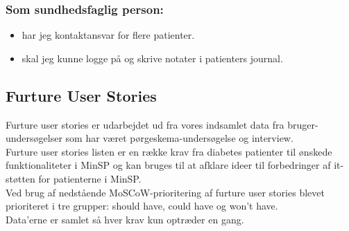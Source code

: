 \subsubsection*{Som sundhedsfaglig person:}
\begin{itemize}
\item har jeg kontaktansvar for flere patienter.
\item skal jeg kunne logge på og skrive notater i patienters journal.
\end{itemize}
\subsection{Furture User Stories}
Furture user stories er udarbejdet ud fra vores indsamlet data fra bruger-undersøgelser som har været pørgeskema-undersøgelse og interview.\\
Furture user stories listen er en række krav fra diabetes patienter til ønskede funktionaliteter i MinSP og kan bruges til at afklare ideer til forbedringer af it-støtten for patienterne i MinSP.\\
Ved brug af nedstående MoSCoW-prioritering af furture user stories blevet prioriteret i tre grupper: should have, could have og won't have.\\
Data'erne er samlet så hver krav kun optræder en gang. 
